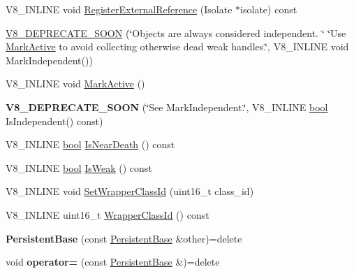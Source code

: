 \begin{DoxyCompactItemize}
V8\+\_\+\+I\+N\+L\+I\+NE void \mbox{\hyperlink{classv8_1_1PersistentBase_a427ad28478a6a208605fca3d39ce4bdf}{Register\+External\+Reference}} (Isolate $\ast$isolate) const
\item 
\mbox{\hyperlink{classv8_1_1PersistentBase_a760df2921447e2344ec564d0268d9d1c}{V8\+\_\+\+D\+E\+P\+R\+E\+C\+A\+T\+E\+\_\+\+S\+O\+ON}} (\char`\"{}Objects are always considered independent. \char`\"{} \char`\"{}Use \mbox{\hyperlink{classv8_1_1PersistentBase_a7244edd33a45b7d95e566fce85e3f87d}{Mark\+Active}} to avoid collecting otherwise dead weak handles.\char`\"{}, V8\+\_\+\+I\+N\+L\+I\+NE void Mark\+Independent())
\item 
V8\+\_\+\+I\+N\+L\+I\+NE void \mbox{\hyperlink{classv8_1_1PersistentBase_a7244edd33a45b7d95e566fce85e3f87d}{Mark\+Active}} ()
\item 
\mbox{\label{classv8_1_1PersistentBase_a65a640cf38fa04620eff99b1c4e2d221}} 
{\bfseries V8\+\_\+\+D\+E\+P\+R\+E\+C\+A\+T\+E\+\_\+\+S\+O\+ON} (\char`\"{}See Mark\+Independent.\char`\"{}, V8\+\_\+\+I\+N\+L\+I\+NE \mbox{\hyperlink{classbool}{bool}} Is\+Independent() const)
\item 
V8\+\_\+\+I\+N\+L\+I\+NE \mbox{\hyperlink{classbool}{bool}} \mbox{\hyperlink{classv8_1_1PersistentBase_a6587b66b7d4c0397129c51d0507b4094}{Is\+Near\+Death}} () const
\item 
V8\+\_\+\+I\+N\+L\+I\+NE \mbox{\hyperlink{classbool}{bool}} \mbox{\hyperlink{classv8_1_1PersistentBase_a479c7b146da083aa608e133a7dec79f9}{Is\+Weak}} () const
\item 
V8\+\_\+\+I\+N\+L\+I\+NE void \mbox{\hyperlink{classv8_1_1PersistentBase_ac4c979164b3ed4dc92319e6f5a108d3d}{Set\+Wrapper\+Class\+Id}} (uint16\+\_\+t class\+\_\+id)
\item 
V8\+\_\+\+I\+N\+L\+I\+NE uint16\+\_\+t \mbox{\hyperlink{classv8_1_1PersistentBase_ac81668d70faff8ee84aa6db410b3ce3c}{Wrapper\+Class\+Id}} () const
\item 
\mbox{\label{classv8_1_1PersistentBase_aa403ece93fda904f5d6ab39e9383a504}} 
{\bfseries Persistent\+Base} (const \mbox{\hyperlink{classv8_1_1PersistentBase}{Persistent\+Base}} \&other)=delete
\item 
\mbox{\label{classv8_1_1PersistentBase_ada3d83b8cadaf4b83027baa41cd99d8c}} 
void {\bfseries operator=} (const \mbox{\hyperlink{classv8_1_1PersistentBase}{Persistent\+Base}} \&)=delete
\end{DoxyCompactItemize}
